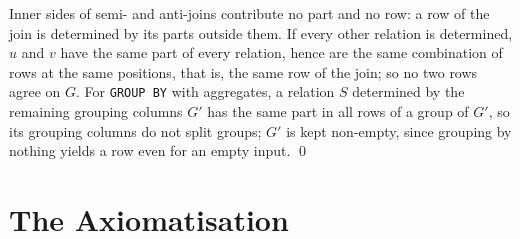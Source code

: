 \documentclass[conference]{IEEEtran}
\theoremstyle{definition}
\newcommand{\sql}[1]{\texttt{#1}}
\begin{document}
Inner sides of semi- and anti-joins contribute no part and no row: a row of the join is
determined by its parts outside them. If every other relation is determined, $u$ and $v$ have
the same part of every relation, hence are the same combination of rows at the same positions,
that is, the same row of the join; so no two rows agree on $G$. For \sql{GROUP BY} with
aggregates, a relation $S$ determined by the remaining grouping columns $G'$ has the same part in
all rows of a group of $G'$, so its grouping columns do not split groups; $G'$ is kept non-empty,
since grouping by nothing yields a row even for an empty input. \qed

\section{The Axiomatisation}\label{app:axiom}
\end{document}
